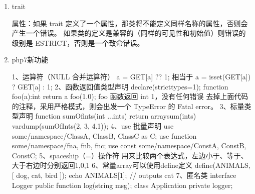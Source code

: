 \documentclass[a4paper,10pt,english]{sphinxmanual}
\begin{document}
\begin{enumerate}
\begin{sphinxVerbatim}[commandchars=\\\{\}]
调用方式不同，is\PYGZus{}callable
    if ( is\PYGZus{}callable( array( \PYGZdl{}obj, \PYGZdl{}method ) ) )
    \PYGZob{}
    /*要操作的代码段*/
    \PYGZcb{}
    method\PYGZus{}exists(\PYGZdl{}obj,\PYGZdl{}method)
    \PYGZdl{}result = is\PYGZus{}callable([\PYGZsq{}\PYGZbs{}app\PYGZbs{}sms\PYGZbs{}model\PYGZbs{}NoDisturbNumber\PYGZsq{},\PYGZsq{}clearData\PYGZsq{}]);
    dump(\PYGZdl{}result);
    \PYGZdl{}result = method\PYGZus{}exists(\PYGZsq{}appsms\PYGZbs{}model\PYGZbs{}NoDisturbNumber\PYGZsq{}, \PYGZdq{}clearData\PYGZdq{});
    dump(\PYGZdl{}result);
其他
    php函数method\PYGZus{}exists()与is\PYGZus{}callable()的区别在于在php5中，一个方法存在并不意味着它就可以被调用。对于 private，protected和public类型的方法，method\PYGZus{}exits()会返回true，但是is\PYGZus{}callable()会检查存在其是否可以访问，如果是private，protected类型的，它会返回false。
\end{sphinxVerbatim}

\item {} 
trait

\begin{sphinxVerbatim}[commandchars=\\\{\}]
属性：如果 trait 定义了一个属性，那类将不能定义同样名称的属性，否则会产生一个错误。
如果类的定义是兼容的（同样的可见性和初始值）则错误的级别是 E\PYGZus{}STRICT，否则是一个致命错误。
\end{sphinxVerbatim}

\item {} 
php7新功能

\begin{sphinxVerbatim}[commandchars=\\\{\}]
1、运算符（NULL 合并运算符）
    \PYGZdl{}a = \PYGZdl{}\PYGZus{}GET[\PYGZsq{}a\PYGZsq{}] ?? 1; 相当于 \PYGZdl{}a = isset(\PYGZdl{}\PYGZus{}GET[\PYGZsq{}a\PYGZsq{}]) ? \PYGZdl{}\PYGZus{}GET[\PYGZsq{}a\PYGZsq{}] : 1;
2、函数返回值类型声明
  \PYGZsh{} declare(strict\PYGZus{}types=1);
    function foo(\PYGZdl{}a):int\PYGZob{}
        return \PYGZdl{}a
    \PYGZcb{}
    foo(1.0); foo 函数返回 int 1，没有任何错误
    去掉上面代码的注释，采用严格模式，则会出发一个 TypeError 的 Fatal error。
3、标量类型声明
    function sumOfints(int ...\PYGZdl{}ints)\PYGZob{}
        return array\PYGZus{}sum(\PYGZdl{}ints)
    \PYGZcb{}
    var\PYGZus{}dump(sumOfInts(2, \PYGZsq{}3\PYGZsq{}, 4.1));
4、use 批量声明
    use some/namespace/\PYGZob{}ClassA, ClassB, ClassC as C\PYGZcb{};
    use function some/namespace/\PYGZob{}fn\PYGZus{}a, fn\PYGZus{}b, fn\PYGZus{}c\PYGZcb{};
    use const some/namespace/\PYGZob{}ConstA, ConstB, ConstC\PYGZcb{};
5、spaceship（\PYGZlt{}=\PYGZgt{}）操作符
    用来比较两个表达式，左边小于、等于、大于右边时分别返回\PYGZhy{}1,0,1
6、常量array可以使用define定义
    define(\PYGZsq{}ANIMALS\PYGZsq{}, [
\PYGZsq{}dog\PYGZsq{},
\PYGZsq{}cat\PYGZsq{},
\PYGZsq{}bird\PYGZsq{}
    ]);
    echo ANIMALS[1]; // outputs \PYGZdq{}cat\PYGZdq{}
7、匿名类
    interface Logger \PYGZob{}
public function log(string \PYGZdl{}msg);
    \PYGZcb{}
    class Application \PYGZob{}
        private \PYGZdl{}logger;


\end{sphinxVerbatim}
\end{enumerate}
\end{document}
